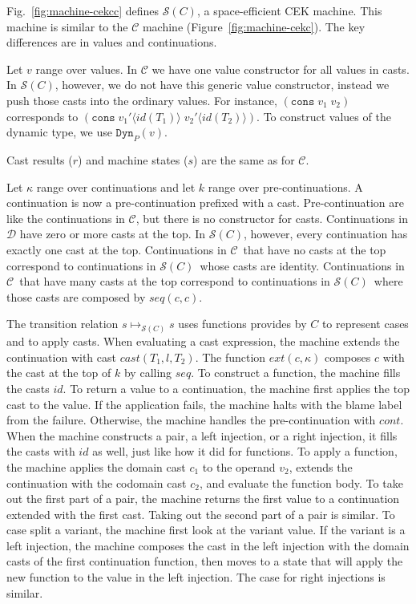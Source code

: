\documentclass[acmsmall,review,anonymous]{acmart}\settopmatter{printfolios=true,printccs=false,printacmref=false}
\newcommand{\figref}[1]{Fig.~\ref{#1}}
\newcommand{\vOOcons}[2]{\mathtt{cons}\;#1\;#2}
\newcommand{\hcvOOinj}[2]{\mathtt{Dyn}_{#1}(#2)}
\newcommand{\hcvOOcons}[4]{\mathtt{cons}\;#1\langle#2\rangle\;#3\langle#4\rangle}
\newcommand{\judgeSreduce}[3]{#2 \longmapsto_{\mathcal{S}(#1)} #3}
\newcommand{\ineffCEK}{$\mathcal{C}$}
\newcommand{\ineffCEKD}{$\mathcal{D}$}
\newcommand{\effCEK}[1]{$\mathcal{S}(#1)$}
\begin{document}
\figref{fig:machine-cekcc} defines \effCEK{C}, a space-efficient CEK
machine.  This machine is similar to the \ineffCEK{} machine
(Figure~\ref{fig:machine-cekc}).  The key differences are in values
and continuations.

Let $v$ range over values. In \ineffCEK{} we have one value
constructor for all values in casts.  In \effCEK{C}, however, we do not
have this generic value constructor, instead we push those casts into
the ordinary values. For instance, $(\vOOcons{v_1}{v_2})$ corresponds
to $(\hcvOOcons{v_1'}{id(T_1)}{v_2'}{id(T_2)})$. To construct values
of the dynamic type, we use $\hcvOOinj{P}{v}$.

Cast results ($r$) and machine states ($s$) are the same as for
\ineffCEK{}.

Let $\kappa$ range over continuations and let $k$ range over
pre-continuations.  A continuation is now a pre-continuation prefixed
with a cast.  Pre-continuation are like the continuations in
\ineffCEK{}, but there is no constructor for casts.  Continuations in
\ineffCEKD{} have zero or more casts at the top.  In \effCEK{C},
however, every continuation has exactly one cast at the top.
Continuations in \ineffCEK\ that have no casts at the top correspond
to continuations in \effCEK{C}\ whose casts are identity.
Continuations in \ineffCEK\ that have many casts at the top correspond
to continuations in \effCEK{C}\ where those casts are composed by
$seq(c,c)$.

The transition relation $\judgeSreduce{C}{s}{s}$ uses functions provides by $C$ 
to represent cases and to apply casts.
%
When evaluating a cast expression, the machine extends the continuation with 
cast $cast(T_1,l,T_2)$. The function $ext(c,\kappa)$ composes $c$ with the cast 
at the top of $k$ by calling $seq$.
%
To construct a function, the machine fills the casts $id$.
%
To return a value to a continuation, the machine first applies the top cast to 
the value. If the application fails, the machine halts with the blame label 
from the failure. Otherwise, the machine handles the pre-continuation with 
$cont$.
%
When the machine constructs a pair, a left injection, or a right injection, it 
fills the casts with $id$ as well, just like how it did for functions. 
%
To apply a function, the machine applies the domain cast $c_1$ to the 
operand $v_2$, extends the continuation with the codomain cast $c_2$, and 
evaluate the function body.
%
To take out the first part of a pair, the machine returns the first value to a 
continuation extended with the first cast. Taking out the second part of a pair 
is similar.
%
To case split a variant, the machine first look at the variant value. If the 
variant is a left injection, the machine composes the cast in the left 
injection with the domain casts of the first continuation function, then moves 
to a state that will apply the new function to the value in the left injection.
The case for right injections is similar.
\end{document}
